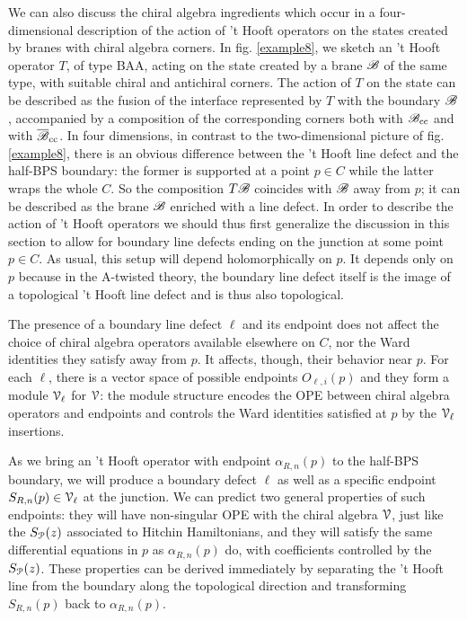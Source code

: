 \documentclass[11pt,a4paper]{article}
\begin{document}
We can also discuss the chiral algebra ingredients which occur in a four-dimensional description of the action of 't Hooft operators on the states created by branes
with chiral algebra corners.  In fig. \ref{example8}, we sketch an 't Hooft operator $T$, of type BAA, acting on the state created by a brane ${\mathscr B}$ of the same type, with
suitable chiral and antichiral corners.  
The action of $T$ on the state can be described as the fusion of the  interface represented by $T$  with the boundary ${\mathscr B}$, accompanied by a composition of the corresponding corners both with ${\mathscr B}_{\mathrm{cc}}$ and with $\overline {{\mathscr B}}_{\mathrm{cc}}$. 
In  four dimensions, in contrast to the two-dimensional picture of fig. \ref{example8},  there is an obvious difference between the 't Hooft line defect and the half-BPS boundary: the former is supported at a point $p\in C$ while the latter wraps the whole $C$. 
So the composition $T{\mathscr B}$ coincides with ${\mathscr B}$ away from $p$; it can be described as the brane ${\mathscr B}$ enriched with a line defect.
In order to describe the action of 't Hooft operators we should thus first generalize the discussion in this section to allow for
boundary line defects ending on the junction at some point $p\in C$. As usual, this setup will depend holomorphically on $p$. It depends only on $p$ because in the A-twisted theory, the boundary line defect itself is the image of a topological 't Hooft line defect and is thus also topological. 

The presence of a boundary line defect $\ell$ and its endpoint does not affect the choice of chiral algebra operators available elsewhere on $C$, nor the Ward identities they satisfy away from $p$. It affects, though, their behavior near  $p$. For each $\ell$, there is  a vector space of possible endpoints $O_{\ell,i}(p)$ and they form a module ${\cal V}_\ell$ for ${\cal V}$: the module structure encodes the OPE between chiral algebra 
operators and endpoints and controls the Ward identities satisfied at $p$ by the ${\cal V}_\ell$ insertions.  

As we bring an 't Hooft operator with endpoint $\alpha_{R,n}(p)$ to the half-BPS boundary, we will produce a boundary defect $\ell$ as well as 
a specific endpoint $S_{R,n}(p) \in {\cal V}_\ell$ at the junction. We can predict two general properties of such endpoints: they will have non-singular OPE with the chiral algebra ${\cal V}$, just like the  $S_{\cal P}(z)$ associated to Hitchin Hamiltonians, and they will satisfy the same differential equations in $p$ as $\alpha_{R,n}(p)$ do, with coefficients controlled by the $S_{\cal P}(z)$. These properties can be derived immediately by separating the 't Hooft line from the boundary along the topological direction and transforming $S_{R,n}(p)$ back to $\alpha_{R,n}(p)$.
\end{document}
